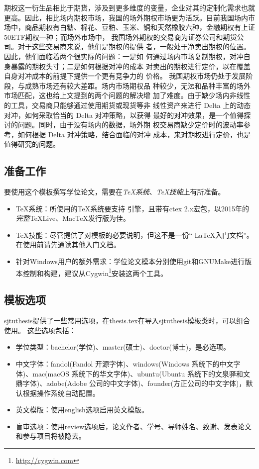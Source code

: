期权这一衍生品相比于期货，涉及到更多维度的变量，企业对其的定制化需求也就更高。因此，相比场内期权市场，我国的场外期权市场更为活跃。目前我国场内市场中，商品期权有白糖、棉花、豆粕、玉米、铜和天然橡胶六种，金融期权有上证50ETF期权一种；而场外市场中， 我国场外期权的交易商为证券公司和期货公司。对于这些交易商来说，他们是期权的提供 者，一般处于净卖出期权的位置。因此，他们面临着两个很实际的问题：一是如 何通过场内市场复制期权，对冲自身暴露的期权头寸；二是如何根据对冲的成本 对卖出的期权进行定价，以在覆盖自身对冲成本的前提下提供一个更有竞争力的 价格。 我国期权市场仍处于发展阶段，与成熟市场还有较大差距。场内市场期权品 种较少，无法和品种丰富的场外市场匹配，这也给上文提到的两个问题的解决增 加了难度。由于缺少场内非线性的工具，交易商只能够通过使用期货或现货等非 线性资产来进行 Delta 上的动态对冲，如何采取恰当的 Delta 对冲策略，以获得 最好的对冲效果，是一个值得探讨的问题。同时，由于没有场内的数据，场外期 权交易商缺少定价时的波动率参考，如何根据 Delta 对冲策略，结合面临的对冲 成本，来对期权进行定价，也是值得研究的问题。



\subsection{准备工作}
\label{sec:requirements}

要使用这个模板撰写学位论文，需要在\emph{TeX系统}、\emph{TeX技能}上有所准备。

\begin{itemize}[noitemsep,topsep=0pt,parsep=0pt,partopsep=0pt]
	\item {\TeX}系统：所使用的{\TeX}系统要支持 \XeTeX 引擎，且带有ctex 2.x宏包，以2015年的\emph{完整}TeXLive、MacTeX发行版为佳。
	\item TeX技能：尽管提供了对模板的必要说明，但这不是一份“ \LaTeX 入门文档”。在使用前请先通读其他入门文档。
	\item 针对Windows用户的额外需求：学位论文模本分别使用git和GNUMake进行版本控制和构建，建议从Cygwin\footnote{\url{http://cygwin.com}}安装这两个工具。
\end{itemize}

\subsection{模板选项}
\label{sec:thesisoption}

sjtuthesis提供了一些常用选项，在thesis.tex在导入sjtuthesis模板类时，可以组合使用。
这些选项包括：

\begin{itemize}[noitemsep,topsep=0pt,parsep=0pt,partopsep=0pt]
	\item 学位类型：bachelor(学位)、master(硕士)、doctor(博士)，是必选项。
	\item 中文字体：fandol(Fandol 开源字体)、windows(Windows 系统下的中文字体)、mac(macOS 系统下的华文字体)、ubuntu(Ubuntu 系统下的文泉驿和文鼎字体)、adobe(Adobe 公司的中文字体)、founder(方正公司的中文字体)，默认根据操作系统自动配置。
	\item 英文模版：使用english选项启用英文模版。
	\item 盲审选项：使用review选项后，论文作者、学号、导师姓名、致谢、发表论文和参与项目将被隐去。
\end{itemize}


